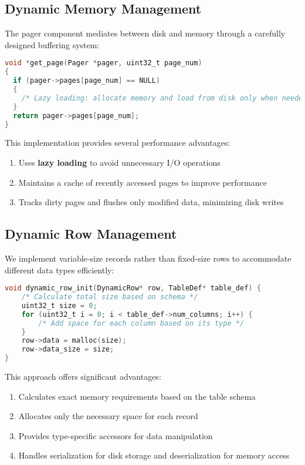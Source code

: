 \documentclass[12pt,a4paper]{article}  %
\begin{document}
\subsection{Dynamic Memory Management}

The pager component mediates between disk and memory through a carefully designed buffering system:

\begin{lstlisting}[language=C]
void *get_page(Pager *pager, uint32_t page_num)
{
  if (pager->pages[page_num] == NULL)
  {
    /* Lazy loading: allocate memory and load from disk only when needed */
  }
  return pager->pages[page_num];
}
\end{lstlisting}

This implementation provides several performance advantages:
\begin{enumerate}
    \item Uses \textbf{lazy loading} to avoid unnecessary I/O operations
    \item Maintains a cache of recently accessed pages to improve performance
    \item Tracks dirty pages and flushes only modified data, minimizing disk writes
\end{enumerate}

\subsection{Dynamic Row Management}

We implement variable-size records rather than fixed-size rows to accommodate different data types efficiently:

\begin{lstlisting}[language=C]
void dynamic_row_init(DynamicRow* row, TableDef* table_def) {
    /* Calculate total size based on schema */
    uint32_t size = 0;
    for (uint32_t i = 0; i < table_def->num_columns; i++) {
        /* Add space for each column based on its type */
    }
    row->data = malloc(size);
    row->data_size = size;
}
\end{lstlisting}

This approach offers significant advantages:
\begin{enumerate}
    \item Calculates exact memory requirements based on the table schema
    \item Allocates only the necessary space for each record
    \item Provides type-specific accessors for data manipulation
    \item Handles serialization for disk storage and deserialization for memory access
\end{enumerate}
\end{document}
